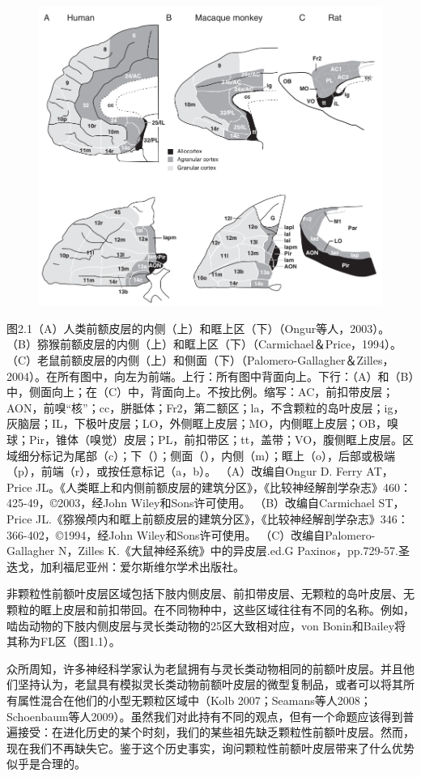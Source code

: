 \begin{figure}
	\centering
	\includegraphics[width=0.7\linewidth]{1.png}
\end{figure}

图2.1（A）人类前额皮层的内侧（上）和眶上区（下）（Ongur等人，2003）。 （B）猕猴前额皮层的内侧（上）和眶上区（下）（Carmichael＆Price，1994）。 （C）老鼠前额皮层的内侧（上）和侧面（下）（Palomero-Gallagher＆Zilles，2004）。在所有图中，向左为前端。上行：所有图中背面向上。下行：（A）和（B）中，侧面向上；在（C）中，背面向上。不按比例。缩写：AC，前扣带皮层；AON，前嗅“核”；cc，胼胝体；Fr2，第二额区；la，不含颗粒的岛叶皮层；ig，灰脑层；IL，下极叶皮层；LO，外侧眶上皮层；MO，内侧眶上皮层；OB，嗅球；Pir，锥体（嗅觉）皮层；PL，前扣带区；tt，盖带；VO，腹侧眶上皮层。区域细分标记为尾部（c）；下（）；侧面（），内侧（m）；眶上（o），后部或极端（p），前端（r），或按任意标记（a，b）。 （A）改编自Ongur D. Ferry AT，Price JL。《人类眶上和内侧前额皮层的建筑分区》，《比较神经解剖学杂志》460：425-49，©2003，经John Wiley和Sons许可使用。 （B）改编自Carmichael ST，Price JL.《猕猴颅内和眶上前额皮层的建筑分区》，《比较神经解剖学杂志》346：366-402，©1994，经John Wiley和Sons许可使用。 （C）改编自Palomero-Gallagher N，Zilles K.《大鼠神经系统》中的异皮层.ed.G Paxinos，pp.729-57.圣迭戈，加利福尼亚州：爱尔斯维尔学术出版社。

非颗粒性前额叶皮层区域包括下肢内侧皮层、前扣带皮层、无颗粒的岛叶皮层、无颗粒的眶上皮层和前扣带回。在不同物种中，这些区域往往有不同的名称。例如，啮齿动物的下肢内侧皮层与灵长类动物的25区大致相对应，von Bonin和Bailey将其称为FL区（图1.1）。

众所周知，许多神经科学家认为老鼠拥有与灵长类动物相同的前额叶皮层。并且他们坚持认为，老鼠具有模拟灵长类动物前额叶皮层的微型复制品，或者可以将其所有属性混合在他们的小型无颗粒区域中（Kolb 2007；Seamans等人2008；Schoenbaum等人2009）。虽然我们对此持有不同的观点，但有一个命题应该得到普遍接受：在进化历史的某个时刻，我们的某些祖先缺乏颗粒性前额叶皮层。然而，现在我们不再缺失它。鉴于这个历史事实，询问颗粒性前额叶皮层带来了什么优势似乎是合理的。

